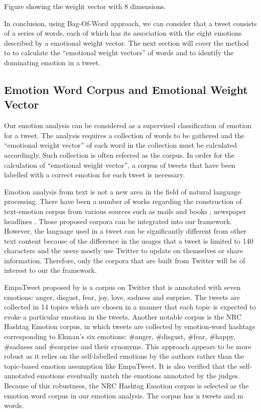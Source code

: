 Figure showing the weight vector with 8 dimensions.

In conclusion, using Bag-Of-Word approach, we can consider that a tweet consists of a series of words, each of which has its association with the eight emotions described by a emotional weight vector. The next section will cover the method to to calculate the ``emotional weight vectors'' of words and to identify the dominating emotion in a tweet.

\subsection{Emotion Word Corpus and Emotional Weight Vector}
Our emotion analysis can be considered as a supervised classification of emotion for a tweet. The analysis requires a collection of words to be gathered and the ``emotional weight vector'' of each word in the collection must be calculated accordingly. Such collection is often referred as the corpus. In order for the calculation of ``emotional weight vector'', a corpus of tweets that have been labelled with a correct emotion for each tweet is necessary.

Emotion analysis from text is not a new area in the field of natural language processing. There have been a number of works regarding the construction of text-emotion corpus from various sources such as mails \citep{mohammad2011tracking} and books \citep{mohammad2011once}, newspaper headlines \citep{strapparava2008learning}. Those proposed corpora can be integrated into our framework. However, the language used in a tweet can be significantly different from other text content because of the difference in the usages that a tweet is limited to 140 characters and the users mostly use Twitter to update on themselves or share information. Therefore, only the corpora that are built from Twitter will be of interest to our the framework.

EmpaTweet proposed by \citet{roberts2012empatweet} is a corpus on Twitter that is annotated with seven emotions: anger, disgust, fear, joy, love, sadness and surprise. The tweets are collected in 14 topics which are chosen in a manner that each topic is expected to evoke a particular emotion in the tweets. Another notable corpus is the NRC Hashtag Emotion corpus, in which tweets are collected by emotion-word hashtags corresponding to Ekman's six emotions: \#anger, \#disgust, \#fear, \#happy, \#sadness and \#surprise and their synonyms\citep{mohammad2012emotional}. This approach appears to be more robust as it relies on the self-labelled emotions by the authors rather than the topic-based emotion assumption like EmpaTweet. It is also verified that the self-annotated emotions eventually match the emotions annotated by the judges. Because of this robustness, the NRC Hashtag Emotion corpus is selected as the emotion word corpus in our emotion analysis. The corpus has n tweets and m words.


